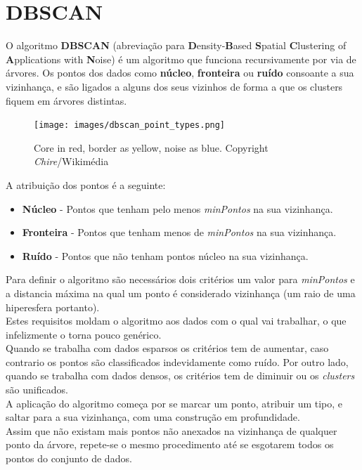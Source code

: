 \documentclass[]{report}
\begin{document}
\section{DBSCAN}
O algoritmo \textbf{DBSCAN} (abreviação para \textbf{D}ensity-\textbf{B}ased \textbf{S}patial \textbf{C}lustering of \textbf{A}pplications with \textbf{N}oise) é um algoritmo que funciona recursivamente por via de árvores. Os pontos dos dados como \textbf{núcleo}, \textbf{fronteira} ou \textbf{ruído} consoante a sua vizinhança, e são ligados a alguns dos seus vizinhos de forma a que os clusters fiquem em árvores distintas.
\vspace{5mm}
\begin{figure}
    \begin{center}
        \texttt{[image: images/dbscan\_point\_types.png]}
        \caption{Core in red, border as yellow, noise as blue. Copyright \textit{Chire}/Wikimédia}
	\end{center}
	\vspace{-50pt}
\end{figure}
A atribuição dos pontos é a seguinte:
\begin{itemize}
\item \textbf{Núcleo} - Pontos que tenham pelo menos \textit{minPontos} na sua vizinhança.
\item \textbf{Fronteira} - Pontos que tenham menos de \textit{minPontos} na sua vizinhança.
\item \textbf{Ruído} - Pontos que não tenham pontos núcleo na sua vizinhança.
\end{itemize}
Para definir o algoritmo são necessários dois critérios um valor para \textit{minPontos} e a distancia máxima na qual um ponto é considerado vizinhança (um raio de uma hiperesfera portanto).\\
Estes requisitos moldam o algoritmo aos dados com o qual vai trabalhar, o que infelizmente o torna pouco genérico.\\[2mm]
Quando se trabalha com dados esparsos os critérios tem de aumentar, caso contrario os pontos são classificados indevidamente como ruído.
Por outro lado, quando se trabalha com dados densos, os critérios tem de diminuir ou os \textit{clusters} são unificados.\\[2mm]
A aplicação do algoritmo começa por se marcar um ponto, atribuir um tipo, e saltar para a sua vizinhança, com uma construção em profundidade.\\
Assim que não existam mais pontos não anexados na vizinhança de qualquer ponto da árvore, repete-se o mesmo procedimento até se esgotarem todos os pontos do conjunto de dados.
\clearpage
\end{document}
